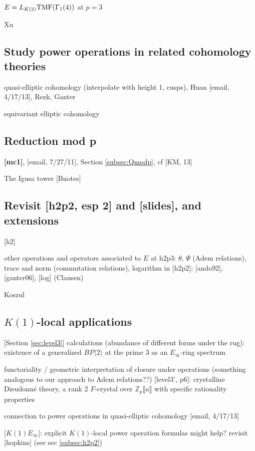 \documentclass{rs}
\theoremstyle{definition}
\theoremstyle{remark}
\newcommand{\mb}[1]{\mathbb{#1}}
\newcommand{\BZ}{{\mb Z}}
\newcommand{\TMF}{{\rm TMF}}
\newcommand{\G}{\Gamma}
\renewcommand{\=}{\approx}
\renewcommand{\-}{\sim}
\numberwithin{equation}{section}
\numberwithin{thm}{section}
\begin{document}
$E = L_{K(2)} \TMF(\G_1(4))$ at $p = 3$ 

Xu 


\subsection{Study power operations in related cohomology theories}
\label{subsec:relct}

quasi-elliptic cohomology (interpolate with height 1, cusps), Huan [email, 4/17/13], Rezk, Ganter 

equivariant elliptic cohomology 


\subsection{Reduction mod p}

\textbf{[mc1]}, [email, 7/27/11], Section \ref{subsec:Qmodp}, cf [KM, 13] 

The Igusa tower [Bnotes] 


\subsection{Revisit [h2p2, esp 2] and [slides], and extensions}

[h2] 

other operations and operators associated to $E$ at h2p3: 
$\theta$, $\Psi$ (Adem relations), trace and norm (commutation relations), logarithm in [h2p2]; [ando92], [ganter06], [log] (Clausen) 

Koszul 


\subsection{$K(1)$-local applications}

[Section \ref{sec:level3}] 
calculations (abundance of different forms under the rug): 
existence of a generalized $BP\langle2\rangle$ at the prime 3 as an $E_\infty$-ring spectrum 

functoriality / geometric interpretation of closure under operations (something analogous to our approach to Adem relations??) 
[level3', p6]: crystalline Dieudonn\'e theory, a rank 2 $F$-crystal over $\BZ_p \llbracket a \rrbracket$ with specific rationality properties 

connection to power operations in quasi-elliptic cohomology [email, 4/17/13] 

[$K(1)E_\infty$]: explicit $K(1)$-local power operation formulas might help? revisit [hopkins] (see sec \ref{subsec:h2p2}) 
\end{document}
